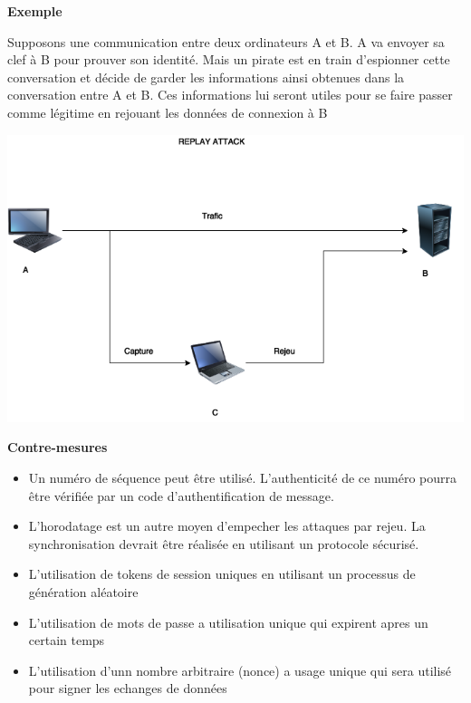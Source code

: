 \bigskip

\begin{flushleft}
\textbf{Exemple}
\end{flushleft}

\smallskip

\begin{flushleft}
Supposons une communication entre deux ordinateurs A et B. A va envoyer sa clef à B pour prouver son identité. Mais un pirate est en train d'espionner cette conversation et décide de garder les informations ainsi obtenues dans la conversation entre A et B. Ces informations lui seront utiles pour se faire passer comme légitime en rejouant les données de connexion à B
\end{flushleft}

\smallskip

\begin{center}
\includegraphics[scale=0.3]{Network/assets/rejeu.png}
\end{center}

\bigskip


\begin{flushleft}
\textbf{Contre-mesures}
\end{flushleft}

\smallskip

\begin{itemize}
\item Un numéro de séquence peut être utilisé. L'authenticité de ce numéro pourra être vérifiée par un code d'authentification de message.
\item L'horodatage est un autre moyen d'empecher les attaques par rejeu. La synchronisation devrait être réalisée en utilisant un protocole sécurisé.
\item L'utilisation de tokens de session uniques en utilisant un processus de génération aléatoire
\item L'utilisation de mots de passe a utilisation unique qui expirent apres un certain temps
\item L'utilisation d'unn nombre arbitraire (nonce) a usage unique qui sera utilisé pour signer les echanges de données
\end{itemize}

